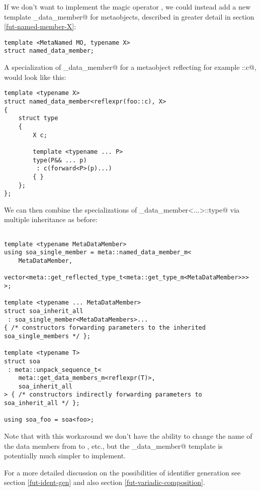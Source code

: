 If we don't want to implement the magic operator \verb@identifier@,
we could instead add a new template \verb@named_data_member@
for  metaobjects, described in greater detail in section
\ref{fut-named-member-X}:

\begin{verbatim}
template <MetaNamed MO, typename X>
struct named_data_member;
\end{verbatim}

A specialization of \verb@named_data_member@ for a metaobject reflecting
for example \verb@foo::c@, would look like this:

\begin{verbatim}
template <typename X>
struct named_data_member<reflexpr(foo::c), X>
{
	struct type
	{
		X c;

		template <typename ... P>
		type(P&& ... p)
		 : c(forward<P>(p)...) 
		{ }
	};
};
\end{verbatim}

We can then combine the specializations of \verb@named_data_member<...>::type@
via multiple inheritance as before:

\begin{verbatim}

template <typename MetaDataMember>
using soa_single_member = meta::named_data_member_m<
	MetaDataMember,
	vector<meta::get_reflected_type_t<meta::get_type_m<MetaDataMember>>>
>;

template <typename ... MetaDataMember>
struct soa_inherit_all
 : soa_single_member<MetaDataMembers>...
{ /* constructors forwarding parameters to the inherited soa_single_members */ };

template <typename T>
struct soa
 : meta::unpack_sequence_t<
	meta::get_data_members_m<reflexpr(T)>,
	soa_inherit_all
> { /* constructors indirectly forwarding parameters to soa_inherit_all */ };

using soa_foo = soa<foo>;
\end{verbatim}

Note that with this workaround we don't have the ability to change the name
of the data members from \verb@c@ to \verb@cs@, etc., but the \verb@named_data_member@
template is potentially much simpler to implement.

For a more detailed discussion on the possibilities of identifier generation
see section \ref{fut-ident-gen} and also section \ref{fut-variadic-composition}.
